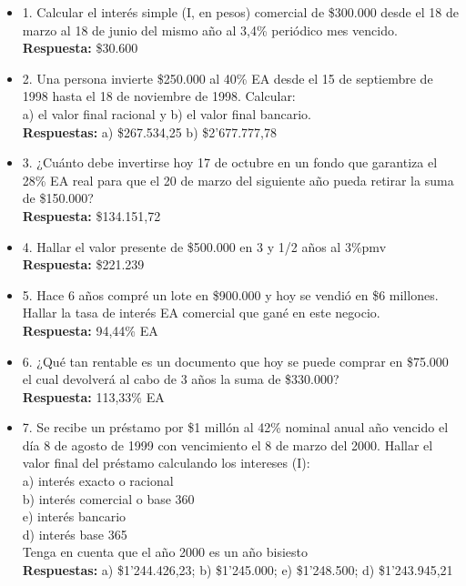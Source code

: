 \begin{itemize}
	\item 1. Calcular el interés simple (I, en pesos) comercial de \$300.000 desde el 18 de marzo al 18 de junio del mismo año al 3,4\% periódico mes vencido.\\
	\textbf{Respuesta:} \$30.600
	\medskip
	
	\item 2. Una persona invierte \$250.000 al 40\% EA desde el 15 de septiembre de 1998 hasta el 18 de noviembre de 1998. Calcular: 
	\\
	a) el valor final racional y
	b) el valor final bancario. 
	\\
	\textbf{Respuestas:} a) \$267.534,25  b) \$2'677.777,78
	\medskip
	
	\item 3. ¿Cuánto debe invertirse hoy 17 de octubre en un fondo que garantiza el 28\% EA  real para que el 20 de marzo del siguiente año pueda retirar la suma de \$150.000?\\
	\textbf{Respuesta:} \$134.151,72
	\medskip
	
	
	\item 4. Hallar el valor presente de \$500.000 en 3 y 1/2 años al 3\%pmv\\
	\textbf{Respuesta:} \$221.239 
	\medskip
	
	\item 5. Hace 6 años compré un lote en \$900.000 y hoy se vendió en \$6 millones. Hallar la tasa de interés EA comercial que gané en este negocio.\\
	\textbf{Respuesta: }94,44\% EA
	\medskip
	
	\item 6. ¿Qué tan rentable es un documento que hoy se puede comprar en \$75.000 el cual devolverá al cabo de 3 años la suma de \$330.000?\\
	\textbf{Respuesta: }113,33\% EA
	\medskip
	
	\item 7. Se recibe un préstamo por \$1 millón al 42\% nominal anual año vencido el día 8 de agosto de 1999 con vencimiento el 8 de marzo del 2000. Hallar el valor final del préstamo calculando los intereses (I):\\
	
	a) interés exacto o racional\\
	b) interés comercial o base 360\\
	e) interés bancario\\
	d) interés base 365\\
	Tenga en cuenta que el año 2000 es un año bisiesto\\
	\textbf{ Respuestas:} a) \$1'244.426,23; b) \$1'245.000; e) \$1'248.500; d) \$1'243.945,21
	\medskip
	

\end{itemize}
